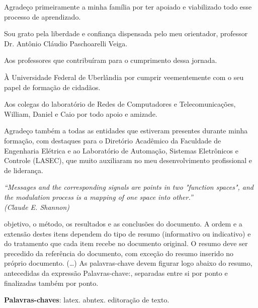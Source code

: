 \documentclass[
  12pt,				%
  openright,			%
  twoside,			%
  a4paper,			%
  english,			%
  french,				%
  spanish,			%
  brazil,				%
  ]{abntex2}
\begin{document}



\begin{agradecimentos}
  Agradeço primeiramente a minha família por ter apoiado e viabilizado todo esse processo de
  aprendizado.

  Sou grato pela liberdade e confiança dispensada pelo meu orientador, professor Dr. Antônio
  Cláudio Paschoarelli Veiga.

  Aos professores que contribuíram para o cumprimento dessa jornada.

  À Universidade Federal de Uberlândia por cumprir veementemente com o seu papel de formação de
  cidadãos.

  Aos colegas do laboratório de Redes de Computadores e Telecomunicações, William, Daniel e Caio
  por todo apoio e amizade.

  Agradeço também a todas as entidades que estiveram presentes durante minha formação, com destaques
  para o Diretório Acadêmico da Faculdade de Engenharia Elétrica e ao Laboratório de Automação,
  Sistemas Eletrônicos e Controle (LASEC), que muito auxiliaram no meu desenvolvimento profissional
  e de liderança.

\end{agradecimentos}

\begin{epigrafe}
  \vspace*{\fill}
  \begin{flushright}
    \textit{``Messages and the corresponding signals are points in two "function spaces", and the
      modulation process is a mapping of one space into other.''\\ (Claude E. Shannon)}
  \end{flushright}
\end{epigrafe}


\setlength{\absparsep}{18pt} %
\begin{resumo}
  objetivo, o método, os resultados e as conclusões do documento. A ordem e a extensão
  destes itens dependem do tipo de resumo (informativo ou indicativo) e do
  tratamento que cada item recebe no documento original. O resumo deve ser
  precedido da referência do documento, com exceção do resumo inserido no
  próprio documento. (\ldots) As palavras-chave devem figurar logo abaixo do
  resumo, antecedidas da expressão Palavras-chave:, separadas entre si por
  ponto e finalizadas também por ponto.

  \noindent
  \textbf{Palavras-chaves}: latex. abntex. editoração de texto.
\end{resumo}
\end{document}
